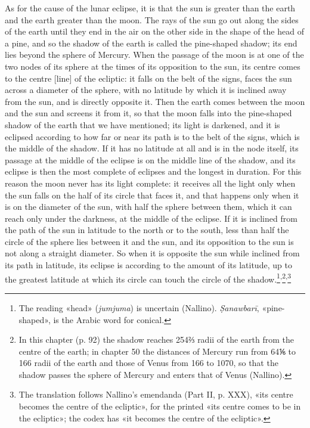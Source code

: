 \documentclass[11pt]{article}
\begin{document}
\par As for the cause of the lunar eclipse, it is that the sun is greater than the earth and the earth greater than the moon. The rays of the sun go out along the sides of the earth until they end in the air on the other side in the shape of the head of a pine, and so the shadow of the earth is called the pine-shaped shadow; its end lies beyond the sphere of Mercury. When the passage of the moon is at one of the two nodes of its sphere at the times of its opposition to the sun, its centre comes to the centre [line] of the ecliptic: it falls on the belt of the signs, faces the sun across a diameter of the sphere, with no latitude by which it is inclined away from the sun, and is directly opposite it. Then the earth comes between the moon and the sun and screens it from it, so that the moon falls into the pine-shaped shadow of the earth that we have mentioned; its light is darkened, and it is eclipsed according to how far or near its path is to the belt of the signs, which is the middle of the shadow. If it has no latitude at all and is in the node itself, its passage at the middle of the eclipse is on the middle line of the shadow, and its eclipse is then the most complete of eclipses and the longest in duration. For this reason the moon never has its light complete: it receives all the light only when the sun falls on the half of its circle that faces it, and that happens only when it is on the diameter of the sun, with half the sphere between them, which it can reach only under the darkness, at the middle of the eclipse. If it is inclined from the path of the sun in latitude to the north or to the south, less than half the circle of the sphere lies between it and the sun, and its opposition to the sun is not along a straight diameter. So when it is opposite the sun while inclined from its path in latitude, its eclipse is according to the amount of its latitude, up to the greatest latitude at which its circle can touch the circle of the shadow.\footnote{The reading «head» (\emph{jumjuma}) is uncertain (Nallino). \emph{Ṣanawbarī}, «pine-shaped», is the Arabic word for conical.}\textsuperscript{,}\footnote{In this chapter (p. 92) the shadow reaches 254⅔ radii of the earth from the centre of the earth; in chapter 50 the distances of Mercury run from 64⅙ to 166 radii of the earth and those of Venus from 166 to 1070, so that the shadow passes the sphere of Mercury and enters that of Venus (Nallino).}\textsuperscript{,}\footnote{The translation follows Nallino's emendanda (Part II, p. XXX), «its centre becomes the centre of the ecliptic», for the printed «its centre comes to be in the ecliptic»; the codex has «it becomes the centre of the ecliptic».}\par
\end{document}
